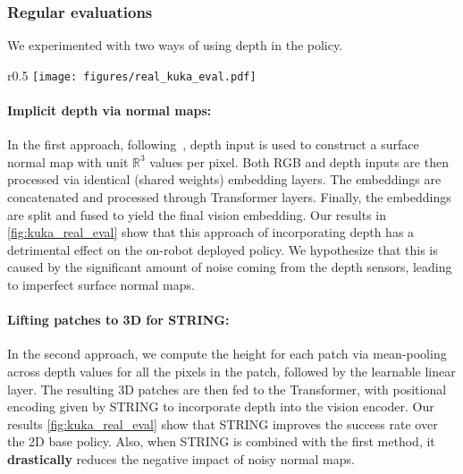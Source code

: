 \subsubsection{Regular evaluations}
\label{sec:regular_evals_rgl}
We experimented with two ways of using depth in the policy.

\begin{wrapfigure}{r}{0.5\textwidth}
\centering \vspace{-3mm}
\texttt{[image: figures/real\_kuka\_eval.pdf]}
\vspace{-4mm}
\label{fig:kuka_real_eval}
\vspace{-6mm}
\end{wrapfigure}
\paragraph{Implicit depth via normal maps:} In the first approach, following~\citep{10341422}, depth input is used to construct a surface normal map with unit $\mathbb{R}^3$ values per pixel. %
Both RGB and depth inputs are then processed via identical (shared weights) embedding layers. The embeddings are concatenated and processed through Transformer layers. Finally, the embeddings are split and fused to yield the final vision embedding. Our results in \cref{fig:kuka_real_eval} show that this approach of incorporating depth has a detrimental effect on the on-robot deployed policy. We hypothesize that this is caused by the significant amount of noise coming from the depth sensors, leading to imperfect surface normal maps.
\vspace{-3mm}
\paragraph{Lifting patches to 3D for STRING:} In the second approach, we compute the height for each patch via mean-pooling across depth values for all the pixels in the patch, followed by the learnable linear layer. The resulting 3D patches are then fed to the Transformer, with positional encoding given by STRING to incorporate depth into the vision encoder. Our results \cref{fig:kuka_real_eval} show that STRING improves the success rate over the 2D base policy. Also, when STRING is combined with the first method, it \textbf{drastically} reduces the negative impact of noisy normal maps.

